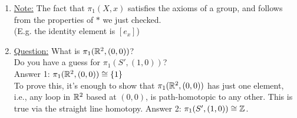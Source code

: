 \begin{enumerate}
\begin{enumerate}
                \item \underline{Note:} The fact that $\pi_1(X,x)$ satisfies the axioms of a group, and follows from the
                    properties of $*$ we just checked.\\
                    (E.g. the identity element is $[e_x]$)\\
                \item \underline{Question:} What is $\pi_1(\mathbb{R}^2, (0,0))$?\\
                    Do you have a guess for $\pi_{1}(S', (1,0))$?\\
                    Answer 1: $\pi_1(\mathbb{R}^2, (0,0))\cong \{1\}$\\
                    To prove this, it's enough to show that $\pi_1(\mathbb{R}^2, (0,0))$ has just one element,\\
                    i.e., any loop in $\mathbb{R}^2$ based at $(0,0)$, is path-homotopic to any other. This is true
                    via the straight line homotopy.
                    Answer 2: $\pi_1(S', (1,0))\cong \mathbb{Z}$.\\
            \end{enumerate}
    \end{enumerate}
